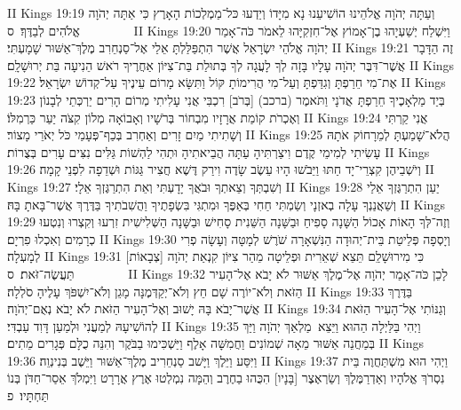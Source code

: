 II Kings 19:19	וְעַתָּה יְהֹוָה אֱלֹהֵינוּ הוֹשִׁיעֵנוּ נָא מִיָּדוֹ וְיֵדְעוּ כּל־מַמְלְכוֹת הָאָרֶץ כִּי אַתָּה יְהֹוָה אֱלֹהִים לְבַדֶּךָ׃ {ס}        
II Kings 19:20	וַיִּשְׁלַח יְשַׁעְיָהוּ בֶן־אָמוֹץ אֶל־חִזְקִיָּהוּ לֵאמֹר כֹּה־אָמַר יְהֹוָה אֱלֹהֵי יִשְׂרָאֵל אֲשֶׁר הִתְפַּלַּלְתָּ אֵלַי אֶל־סַנְחֵרִב מֶלֶךְ־אַשּׁוּר שָׁמָעְתִּי׃
II Kings 19:21	זֶה הַדָּבָר אֲשֶׁר־דִּבֶּר יְהֹוָה עָלָיו בָּזָה לְךָ לָעֲגָה לְךָ בְּתוּלַת בַּת־צִיּוֹן אַחֲרֶיךָ רֹאשׁ הֵנִיעָה בַּת יְרוּשָׁלָ͏ִם׃
II Kings 19:22	אֶת־מִי חֵרַפְתָּ וְגִדַּפְתָּ וְעַל־מִי הֲרִימוֹתָ קּוֹל וַתִּשָּׂא מָרוֹם עֵינֶיךָ עַל־קְדוֹשׁ יִשְׂרָאֵל׃
II Kings 19:23	בְּיַד מַלְאָכֶיךָ חֵרַפְתָּ  אֲדֹנָי וַתֹּאמֶר (ברכב) [בְּרֹב] רִכְבִּי אֲנִי עָלִיתִי מְרוֹם הָרִים יַרְכְּתֵי לְבָנוֹן וְאֶכְרֹת קוֹמַת אֲרָזָיו מִבְחוֹר בְּרֹשָׁיו וְאָבוֹאָה מְלוֹן קִצֹּה יַעַר כַּרְמִלּוֹ׃
II Kings 19:24	אֲנִי קַרְתִּי וְשָׁתִיתִי מַיִם זָרִים וְאַחְרִב בְּכַף־פְּעָמַי כֹּל יְאֹרֵי מָצוֹר׃
II Kings 19:25	הֲלֹא־שָׁמַעְתָּ לְמֵרָחוֹק אֹתָהּ עָשִׂיתִי לְמִימֵי קֶדֶם וִיצַרְתִּיהָ עַתָּה הֲבֵיאתִיהָ וּתְהִי לַהְשׁוֹת גַּלִּים נִצִּים עָרִים בְּצֻרוֹת׃
II Kings 19:26	וְיֹשְׁבֵיהֶן קִצְרֵי־יָד חַתּוּ וַיֵּבֹשׁוּ הָיוּ עֵשֶׂב שָׂדֶה וִירַק דֶּשֶׁא חֲצִיר גַּגּוֹת וּשְׁדֵפָה לִפְנֵי קָמָה׃
II Kings 19:27	וְשִׁבְתְּךָ וְצֵאתְךָ וּבֹאֲךָ יָדָעְתִּי וְאֵת הִתְרַגֶּזְךָ אֵלָי׃
II Kings 19:28	יַעַן הִתְרַגֶּזְךָ אֵלַי וְשַׁאֲנַנְךָ עָלָה בְאזְנָי וְשַׂמְתִּי חַחִי בְּאַפֶּךָ וּמִתְגִּי בִּשְׂפָתֶיךָ וַהֲשִׁבֹתִיךָ בַּדֶּרֶךְ אֲשֶׁר־בָּאתָ בָּהּ׃
II Kings 19:29	וְזֶה־לְּךָ הָאוֹת אָכוֹל הַשָּׁנָה סָפִיחַ וּבַשָּׁנָה הַשֵּׁנִית סָחִישׁ וּבַשָּׁנָה הַשְּׁלִישִׁית זִרְעוּ וְקִצְרוּ וְנִטְעוּ כְרָמִים וְאִכְלוּ פִרְיָם׃
II Kings 19:30	וְיָסְפָה פְּלֵיטַת בֵּית־יְהוּדָה הַנִּשְׁאָרָה שֹׁרֶשׁ לְמָטָּה וְעָשָׂה פְרִי לְמָעְלָה׃
II Kings 19:31	כִּי מִירוּשָׁלַ͏ִם תֵּצֵא שְׁאֵרִית וּפְלֵיטָה מֵהַר צִיּוֹן קִנְאַת יְהֹוָה [צְבָאוֹת] תַּעֲשֶׂה־זֹּאת׃ {ס}        
II Kings 19:32	לָכֵן כֹּה־אָמַר יְהֹוָה אֶל־מֶלֶךְ אַשּׁוּר לֹא יָבֹא אֶל־הָעִיר הַזֹּאת וְלֹא־יוֹרֶה שָׁם חֵץ וְלֹא־יְקַדְּמֶנָּה מָגֵן וְלֹא־יִשְׁפֹּךְ עָלֶיהָ סֹלְלָה׃
II Kings 19:33	בַּדֶּרֶךְ אֲשֶׁר־יָבֹא בָּהּ יָשׁוּב וְאֶל־הָעִיר הַזֹּאת לֹא יָבֹא נְאֻם־יְהֹוָה׃
II Kings 19:34	וְגַנּוֹתִי אֶל־הָעִיר הַזֹּאת לְהוֹשִׁיעָהּ לְמַעֲנִי וּלְמַעַן דָּוִד עַבְדִּי׃
II Kings 19:35	וַיְהִי בַּלַּיְלָה הַהוּא וַיֵּצֵא  מַלְאַךְ יְהֹוָה וַיַּךְ בְּמַחֲנֵה אַשּׁוּר מֵאָה שְׁמוֹנִים וַחֲמִשָּׁה אָלֶף וַיַּשְׁכִּימוּ בַבֹּקֶר וְהִנֵּה כֻלָּם פְּגָרִים מֵתִים׃
II Kings 19:36	וַיִּסַּע וַיֵּלֶךְ וַיָּשׁב סַנְחֵרִיב מֶלֶךְ־אַשּׁוּר וַיֵּשֶׁב בְּנִינְוֵה׃
II Kings 19:37	וַיְהִי הוּא מִשְׁתַּחֲוֶה בֵּית  נִסְרֹךְ אֱלֹהָיו וְאַדְרַמֶּלֶךְ וְשַׂרְאֶצֶר [בָּנָיו] הִכֻּהוּ בַחֶרֶב וְהֵמָּה נִמְלְטוּ אֶרֶץ אֲרָרָט וַיִּמְלֹךְ אֵסַר־חַדֹּן בְּנוֹ תַּחְתָּיו׃ {פ}
